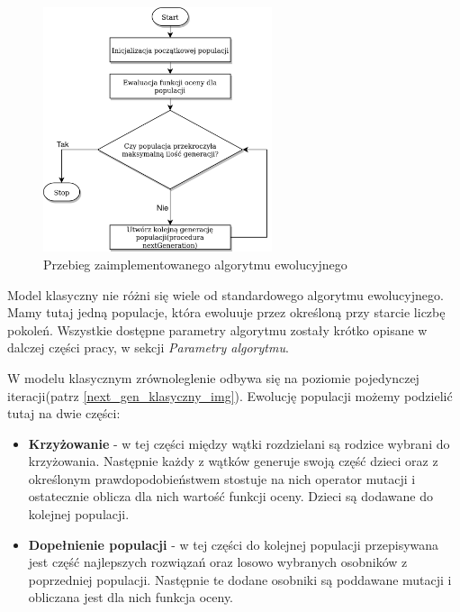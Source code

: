 \begin{figure}[H]
    \centering        
    \includegraphics[width=0.6\textwidth]{img/alg_main.png}
    \caption{Przebieg zaimplementowanego algorytmu ewolucyjnego}
    \label{alg_main_img}
\end{figure}

Model klasyczny nie różni się wiele od standardowego algorytmu ewolucyjnego. Mamy tutaj jedną populacje, która ewoluuje przez 
określoną przy starcie liczbę pokoleń. Wszystkie dostępne parametry algorytmu zostały krótko opisane w dalczej części pracy, 
w sekcji \textit{Parametry algorytmu}.

W modelu klasycznym zrównoleglenie odbywa się na poziomie pojedynczej iteracji(patrz \ref{next_gen_klasyczny_img}). 
Ewolucję populacji możemy podzielić tutaj na dwie części:
\begin{itemize}
    \item \textbf{Krzyżowanie} - w tej części między wątki rozdzielani są rodzice wybrani do krzyżowania. Następnie każdy z wątków generuje swoją część 
    dzieci oraz z określonym prawdopodobieństwem stostuje na nich operator mutacji i ostatecznie oblicza dla nich wartość funkcji oceny. 
    Dzieci są dodawane do kolejnej populacji.
    \item \textbf{Dopełnienie populacji} - w tej części do kolejnej populacji przepisywana jest część najlepszych rozwiązań oraz losowo wybranych osobników 
    z poprzedniej populacji. Następnie te dodane osobniki są poddawane mutacji i obliczana jest dla nich funkcja oceny.
\end{itemize}

\newpage

